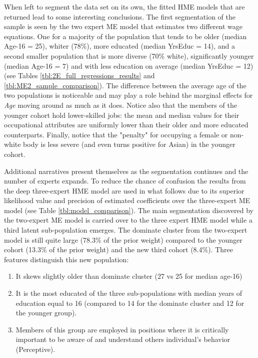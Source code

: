 \documentclass[12pt]{article}
\theoremstyle{definition}
\begin{document}
\bigskip

When left to segment the data set on its own, the fitted HME models that are returned lead to some interesting conclusions. The first segmentation of the sample is seen by the two expert ME model that estimates two different wage equations. One for a majority of the population that tends to be older (median Age-16 = 25), whiter (78\%), more educated (median YrsEduc = 14), and a second smaller population that is more diverse (70\% white), significantly younger (median Age-16 = 7) and with less education on average (median YrsEduc = 12) (see Tables \ref{tbl:2E_full_regressions_results} and \ref{tbl:ME2_sample_comparison}). The difference between the average age of the two populations is noticeable and may play a role behind the marginal effects for \textit{Age} moving around as much as it does. Notice also that the members of the younger cohort hold lower-skilled jobs: the mean and median values for their occupational attributes are uniformly lower than their older and more educated counterparts. Finally, notice that the "penalty" for occupying a female or non-white body is less severe (and even turns positive for Asian) in the younger cohort. 

\bigskip

Additional narratives present themselves as the segmentation continues and the number of experts expands. To reduce the chance of confusion the results from the deep three-expert HME model are used in what follows due to its superior likelihood value and precision of estimated coefficients over the three-expert ME model (see Table \ref{tbl:model_comparison}). The main segmentation discovered by the two-expert ME model is carried over to the three expert HME model while a third latent sub-population emerges. The dominate cluster from the two-expert model is still quite large (78.3\% of the prior weight) compared to the younger cohort (13.3\% of the prior weight) and the new third cohort (8.4\%). Three features distinguish this new population:

\begin{enumerate}
  \item It skews slightly older than dominate cluster (27 vs 25 for median age-16)
  \item It is the most educated of the three sub-populations with median years of education equal to 16 (compared to 14 for the dominate cluster and 12 for the younger group).
  \item Members of this group are employed in positions where it is critically important to be aware of and understand others individual's behavior (Perceptive).
\end{enumerate}
\end{document}
